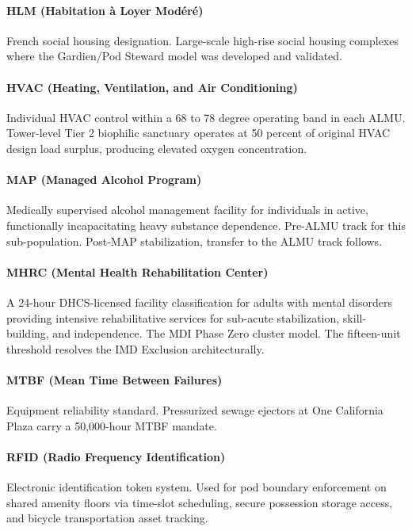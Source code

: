 {\paragraph{HLM (Habitation \`{a} Loyer Mod\'{e}r\'{e})} French social housing designation. Large-scale high-rise social housing complexes where the Gardien/Pod Steward model was developed and validated.

\paragraph{HVAC (Heating, Ventilation, and Air Conditioning)} Individual HVAC control within a 68 to 78 degree operating band in each ALMU. Tower-level Tier 2 biophilic sanctuary operates at 50 percent of original HVAC design load surplus, producing elevated oxygen concentration.

\paragraph{MAP (Managed Alcohol Program)} Medically supervised alcohol management facility for individuals in active, functionally incapacitating heavy substance dependence. Pre-ALMU track for this sub-population. Post-MAP stabilization, transfer to the ALMU track follows.

\paragraph{MHRC (Mental Health Rehabilitation Center)} A 24-hour DHCS-licensed facility classification for adults with mental disorders providing intensive rehabilitative services for sub-acute stabilization, skill-building, and independence. The MDI Phase Zero cluster model. The fifteen-unit threshold resolves the IMD Exclusion architecturally.

\paragraph{MTBF (Mean Time Between Failures)} Equipment reliability standard. Pressurized sewage ejectors at One California Plaza carry a 50,000-hour MTBF mandate.

\paragraph{RFID (Radio Frequency Identification)} Electronic identification token system. Used for pod boundary enforcement on shared amenity floors via time-slot scheduling, secure possession storage access, and bicycle transportation asset tracking.

}
